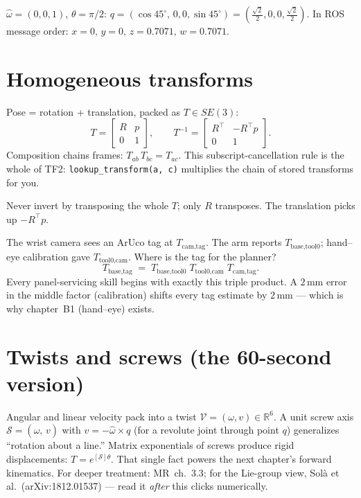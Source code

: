 \begin{example}
$\hat\omega = (0,0,1)$, $\theta = \pi/2$:
$q = (\cos 45^\circ,\, 0,0,\sin 45^\circ) = (\tfrac{\sqrt2}{2}, 0, 0, \tfrac{\sqrt2}{2})$.
In ROS message order: $x{=}0,\, y{=}0,\, z{=}0.7071,\, w{=}0.7071$.
\end{example}

\section{Homogeneous transforms}

Pose = rotation + translation, packed as $T \in SE(3)$:
\[
  T = \begin{bmatrix} R & p \\ 0 & 1 \end{bmatrix}, \qquad
  T^{-1} = \begin{bmatrix} R^\top & -R^\top p \\ 0 & 1 \end{bmatrix} .
\]
Composition chains frames: $T_{ab}\,T_{bc} = T_{ac}$. This subscript-cancellation rule is the
whole of TF2: \texttt{lookup\_transform(a, c)} multiplies the chain of stored transforms for
you.

\begin{keyresult}
Never invert by transposing the whole $T$; only $R$ transposes. The translation picks up
$-R^\top p$.
\end{keyresult}

\begin{example}
The wrist camera sees an ArUco tag at $T_{\text{cam,tag}}$. The arm reports
$T_{\text{base,tool0}}$; hand--eye calibration gave $T_{\text{tool0,cam}}$. Where is the tag
for the planner?
\[
  T_{\text{base,tag}} \;=\; T_{\text{base,tool0}}\; T_{\text{tool0,cam}}\; T_{\text{cam,tag}} .
\]
Every panel-servicing skill begins with exactly this triple product. A $2$\,mm error in the
middle factor (calibration) shifts every tag estimate by $2$\,mm --- which is why
chapter~B1 (hand--eye) exists.
\end{example}

\section{Twists and screws (the 60-second version)}

Angular and linear velocity pack into a twist $\mathcal V = (\omega, v) \in \mathbb R^6$. A
unit screw axis $\mathcal S = (\hat\omega,\, v)$ with $v = -\hat\omega \times q$ (for a
revolute joint through point $q$) generalizes ``rotation about a line.'' Matrix exponentials of
screws produce rigid displacements: $T = e^{[\mathcal S]\theta}$. That single fact powers the
next chapter's forward kinematics. For deeper treatment: MR~ch.~3.3; for the Lie-group view,
Sol\`a et al.\ (arXiv:1812.01537) --- read it \emph{after} this clicks numerically.

